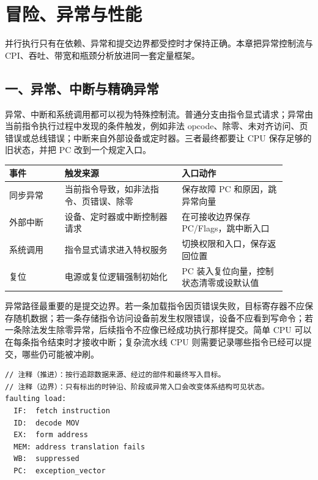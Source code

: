 \chapter{冒险、异常与性能}

\begin{keyidea}
并行执行只有在依赖、异常和提交边界都受控时才保持正确。本章把异常控制流与 CPI、吞吐、带宽和瓶颈分析放进同一套定量框架。
\end{keyidea}

\section{一、异常、中断与精确异常}

异常、中断和系统调用都可以视为特殊控制流。普通分支由指令显式请求；异常由当前指令执行过程中发现的条件触发，例如非法 opcode、除零、未对齐访问、页错误或总线错误；中断来自外部设备或定时器。三者最终都要让 CPU 保存足够的旧状态，并把 PC 改到一个规定入口。

\begin{longtable}{L{0.18\linewidth}L{0.38\linewidth}L{0.34\linewidth}}
\toprule
事件 & 触发来源 & 入口动作 \\
\midrule
同步异常 & 当前指令导致，如非法指令、页错误、除零 & 保存故障 PC 和原因，跳异常向量 \\\tablerowrule
外部中断 & 设备、定时器或中断控制器请求 & 在可接收边界保存 PC/Flags，跳中断入口 \\\tablerowrule
系统调用 & 指令显式请求进入特权服务 & 切换权限和入口，保存返回位置 \\\tablerowrule
复位 & 电源或复位逻辑强制初始化 & PC 装入复位向量，控制状态清零或设默认值 \\
\bottomrule
\end{longtable}

异常路径最重要的是提交边界。若一条加载指令因页错误失败，目标寄存器不应保存随机数据；若一条存储指令访问设备前发生权限错误，设备不应看到写命令；若一条除法发生除零异常，后续指令不应像已经成功执行那样提交。简单 CPU 可以在每条指令结束时才接收中断；复杂流水线 CPU 则需要记录哪些指令已经可以提交，哪些仍可能被冲刷。

\begin{lstlisting}
// 注释（推进）：按行追踪数据来源、经过的部件和最终写入目标。
// 注释（边界）：只有标出的时钟沿、阶段或异常入口会改变体系结构可见状态。
faulting load:
  IF:  fetch instruction
  ID:  decode MOV
  EX:  form address
  MEM: address translation fails
  WB:  suppressed
  PC:  exception_vector
\end{lstlisting}

